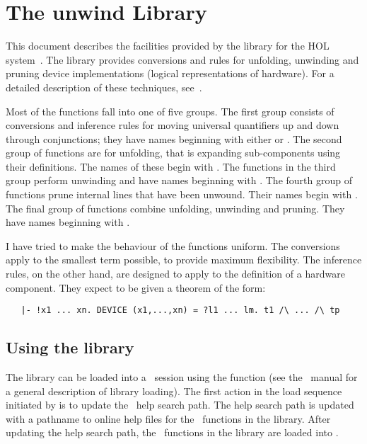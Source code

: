 \chapter{The unwind Library}

This document describes the facilities provided by the  library
for the HOL system~\cite{description}. The library provides conversions and
rules for unfolding, unwinding and pruning device implementations (logical
representations of hardware). For a detailed description of these techniques,
see~\cite{HVusingHOL}.

Most of the functions fall into one of five groups. The first group consists
of conversions and inference rules for moving universal quantifiers up and
down through conjunctions; they have names beginning with either
 or . The second group of functions are for
unfolding, that is expanding sub-components using their definitions. The names
of these begin with . The functions in the third group perform
unwinding and have names beginning with . The fourth group of
functions prune internal lines that have been unwound. Their names begin with
. The final group of functions combine unfolding, unwinding and
pruning. They have names beginning with .

I have tried to make the behaviour of the functions uniform. The conversions
apply to the smallest term possible, to provide maximum flexibility. The
inference rules, on the other hand, are designed to apply to the definition
of a hardware component. They expect to be given a theorem of the form:

\begin{small}\begin{verbatim}
   |- !x1 ... xn. DEVICE (x1,...,xn) = ?l1 ... lm. t1 /\ ... /\ tp
\end{verbatim}\end{small}


\section{Using the library}

The  library can be loaded into a \HOL\ session using the function
 (see the \HOL\
manual for a general description of library loading). The first action in the
load sequence initiated by \ml{load\_library} is to update the \HOL\
help search path. The help search path is
updated with a pathname to online help files for the \ML\ functions in the
library. After updating the help search path, the \ML\ functions in the
library are loaded into \HOL.

